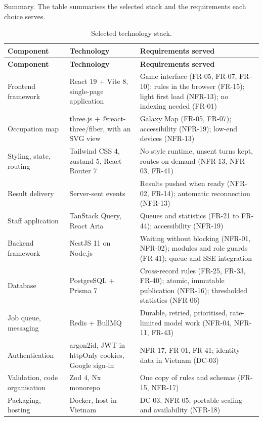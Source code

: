 Summary. The table summarises the selected stack and the requirements each choice serves.

{\small
\begin{longtable}{|>{\raggedright\arraybackslash}p{}|>{\raggedright\arraybackslash}p{}|>{\raggedright\arraybackslash}p{}|}
\caption{Selected technology stack.} \\
\hline
\textbf{Component} & \textbf{Technology} & \textbf{Requirements served} \\ \hline
\endfirsthead
\hline
\textbf{Component} & \textbf{Technology} & \textbf{Requirements served} \\ \hline
\endhead
Frontend framework & React 19 + Vite 8, single-page application & Game interface (FR-05, FR-07, FR-10); rules in the browser (FR-15); light first load (NFR-13); no indexing needed (FR-01) \\ \hline
Occupation map & three.js + @react-three/fiber, with an SVG view & Galaxy Map (FR-05, FR-07); accessibility (NFR-19); low-end devices (NFR-13) \\ \hline
Styling, state, routing & Tailwind CSS 4, zustand 5, React Router 7 & No style runtime, unsent turns kept, routes on demand (NFR-13, NFR-03, FR-41) \\ \hline
Result delivery & Server-sent events & Results pushed when ready (NFR-02, FR-14); automatic reconnection (NFR-13) \\ \hline
Staff application & TanStack Query, React Aria & Queues and statistics (FR-21 to FR-44); accessibility (NFR-19) \\ \hline
Backend framework & NestJS 11 on Node.js & Waiting without blocking (NFR-01, NFR-02); modules and role guards (FR-41); queue and SSE integration \\ \hline
Database & PostgreSQL + Prisma 7 & Cross-record rules (FR-25, FR-33, FR-40); atomic, immutable publication (NFR-16); thresholded statistics (NFR-06) \\ \hline
Job queue, messaging & Redis + BullMQ & Durable, retried, prioritised, rate-limited model work (NFR-04, NFR-11, FR-43) \\ \hline
Authentication & argon2id, JWT in httpOnly cookies, Google sign-in & NFR-17, FR-01, FR-41; identity data in Vietnam (DC-03) \\ \hline
Validation, code organisation & Zod 4, Nx monorepo & One copy of rules and schemas (FR-15, NFR-17) \\ \hline
Packaging, hosting & Docker, host in Vietnam & DC-03, NFR-05; portable scaling and availability (NFR-18) \\ \hline
\end{longtable}
}

